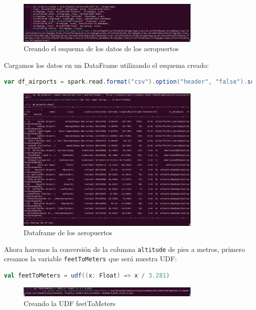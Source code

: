 \begin{figure}[H]
    \centering
    \includegraphics[width=0.8\textwidth]{figures/42.png}
    \caption{Creando el esquema de los datos de los aeropuertos}
    \label{fig:create_airports_schema}
\end{figure}

Cargamos los datos en un DataFrame utilizando el esquema creado:

\begin{lstlisting}[language=scala]
var df_airports = spark.read.format("csv").option("header", "false").schema(airports_schema).load("/home/bigdata/practica/airports.dat")
\end{lstlisting}

\begin{figure}[H]
    \centering
    \includegraphics[width=0.8\textwidth]{figures/43.png}
    \caption{Dataframe de los aeropuertos}
    \label{fig:airports_df}
\end{figure}

Ahora haremos la conversión de la columna \texttt{altitude} de pies a metros, primero creamos la variable \texttt{feetToMeters} que será nuestra UDF:

\begin{lstlisting}[language=scala]
val feetToMeters = udf((x: Float) => x / 3.281)
\end{lstlisting}

\begin{figure}[H]
    \centering
    \includegraphics[width=0.8\textwidth]{figures/44.png}
    \caption{Creando la UDF feetToMeters}
    \label{fig:create_udf}
\end{figure}

